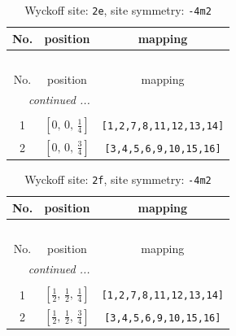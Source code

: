 \documentclass[fleqn,8pt]{jsarticle}
\begin{document}
\begin{longtable}{ccc}
\caption{Wyckoff site: {\tt 2e}, site symmetry: {\tt -4m2}}
 \\
 \hline \hline
No. & position & mapping \\ \hline \endfirsthead

\multicolumn{2}{l}{\tablename\ \thetable{}} \\
 \hline \hline
No. & position & mapping \\ \hline \endhead

 \hline \hline
\multicolumn{2}{r}{\footnotesize\it continued ...} \\ \endfoot

 \hline \hline
\multicolumn{2}{r}{} \\ \endlastfoot

1 & $\left[ 0,\, 0,\, \frac{1}{4} \right]$ & {\tt [1,2,7,8,11,12,13,14]} \\ \hline
2 & $\left[ 0,\, 0,\, \frac{3}{4} \right]$ & {\tt [3,4,5,6,9,10,15,16]} \\
\end{longtable}
\renewcommand{\arraystretch}{1.2}
\begin{longtable}{ccc}
\caption{Wyckoff site: {\tt 2f}, site symmetry: {\tt -4m2}}
 \\
 \hline \hline
No. & position & mapping \\ \hline \endfirsthead

\multicolumn{2}{l}{\tablename\ \thetable{}} \\
 \hline \hline
No. & position & mapping \\ \hline \endhead

 \hline \hline
\multicolumn{2}{r}{\footnotesize\it continued ...} \\ \endfoot

 \hline \hline
\multicolumn{2}{r}{} \\ \endlastfoot

1 & $\left[ \frac{1}{2},\, \frac{1}{2},\, \frac{1}{4} \right]$ & {\tt [1,2,7,8,11,12,13,14]} \\ \hline
2 & $\left[ \frac{1}{2},\, \frac{1}{2},\, \frac{3}{4} \right]$ & {\tt [3,4,5,6,9,10,15,16]} \\
\end{longtable}
\renewcommand{\arraystretch}{1.2}
\end{document}
